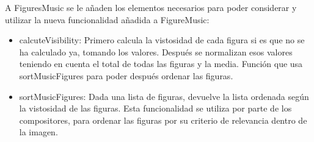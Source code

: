 A FiguresMusic se le añaden los elementos necesarios para poder considerar y utilizar la nueva funcionalidad añadida a FigureMusic:

\begin{itemize}

	\item{calcuteVisibility}: Primero calcula la vistosidad de cada figura si es que no se ha calculado ya, tomando los valores. Después se normalizan esos valores teniendo en cuenta el total de todas las figuras y la media. Función que usa sortMusicFigures para poder después ordenar las figuras.

	\item{sortMusicFigures}: Dada una lista de figuras, devuelve la lista ordenada según la vistosidad de las figuras. Esta funcionalidad se utiliza por parte de los compositores, para ordenar las figuras por su criterio de relevancia dentro de la imagen.

\end{itemize}